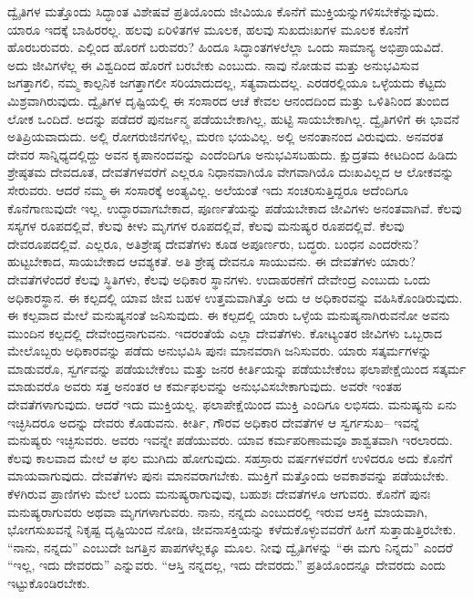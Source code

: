 ದ್ವೈತಿಗಳ ಮತ್ತೊಂದು ಸಿದ್ಧಾಂತ ವಿಶೇಷವೆ ಪ್ರತಿಯೊಂದು ಜೀವಿಯೂ ಕೊನೆಗೆ ಮುಕ್ತಿಯನ್ನುಗಳಿಸಬೇಕೆನ್ನುವುದು. ಯಾರೂ ಇದಕ್ಕೆ ಬಾಹಿರರಲ್ಲ. ಹಲವು ಏರಿಳಿತಗಳ ಮೂಲಕ, ಹಲವು ಸುಖದುಃಖಗಳ ಮೂಲಕ ಕೊನೆಗೆ ಹೊರಬರುವರು. ಎಲ್ಲಿಂದ ಹೊರಗೆ ಬರುವರು? ಹಿಂದೂ ಸಿದ್ಧಾಂತಗಳಲೆಲ್ಲಾ ಒಂದು ಸಾಮಾನ್ಯ ಅಭಿಪ್ರಾಯವಿದೆ. ಅದು ಜೀವಿಗಳೆಲ್ಲ ಈ ವಿಶ್ವದಿಂದ ಹೊರಗೆ ಬರಬೇಕು ಎಂಬುದು. ನಾವು ನೋಡುವ ಮತ್ತು ಅನುಭವಿಸುವ ಜಗತ್ತಾಗಲಿ, ನಮ್ಮ ಕಾಲ್ಪನಿಕ ಜಗತ್ತಾಗಲೀ ಸರಿಯಾದುದಲ್ಲ, ಸತ್ಯವಾದುದಲ್ಲ. ಎರಡರಲ್ಲಿಯೂ ಒಳ್ಳೆಯದು ಕೆಟ್ಟದು ಮಿಶ್ರವಾಗಿರುವುದು. ದ್ವೈತಿಗಳ ದೃಷ್ಟಿಯಲ್ಲಿ ಈ ಸಂಸಾರದ ಆಚೆ ಕೇವಲ ಆನಂದದಿಂದ ಮತ್ತು ಒಳಿತಿನಿಂದ ತುಂಬಿದ ಲೋಕ ಒಂದಿದೆ. ಅದನ್ನು ಪಡೆದರೆ ಪುನರ್ಜನ್ಮ ಪಡೆಯಬೇಕಾಗಿಲ್ಲ, ಹುಟ್ಟಿ ಸಾಯಬೇಕಾಗಿಲ್ಲ. ದ್ವೈತಿಗಳಿಗೆ ಈ ಭಾವನೆ ಅತಿಪ್ರಿಯವಾದುದು. ಅಲ್ಲಿ ರೋಗರುಜಿನಗಳಿಲ್ಲ, ಮರಣ ಭಯವಿಲ್ಲ. ಅಲ್ಲಿ ಅನಂತಾನಂದ ವಿರುವುದು. ಅನವರತ ದೇವರ ಸಾನ್ನಿಧ್ಯದಲ್ಲಿದ್ದು ಅವನ ಕೃಪಾನಂದವನ್ನು ಎಂದೆಂದಿಗೂ ಅನುಭವಿಸಬಹುದು. ಕ್ಷುದ್ರತಮ ಕೀಟದಿಂದ ಹಿಡಿದು ಶ್ರೇಷ್ಠತಮ ದೇವದೂತ, ದೇವತೆಗಳವರೆಗೆ ಎಲ್ಲರೂ ನಿಧಾನವಾಗಿಯೊ ವೇಗವಾಗಿಯೊ ದುಃಖವಿಲ್ಲದ ಆ ಲೋಕವನ್ನು ಸೇರುವರು. ಆದರೆ ನಮ್ಮ ಈ ಸಂಸಾರಕ್ಕೆ ಅಂತ್ಯವಿಲ್ಲ. ಅಲೆಯಂತೆ ಇದು ಸಂಚರಿಸುತ್ತಿದ್ದರೂ ಅದೆಂದಿಗೂ ಕೊನೆಗಾಣುವುದೇ ಇಲ್ಲ. ಉದ್ಧಾರವಾಗಬೇಕಾದ, ಪೂರ್ಣತೆಯನ್ನು ಪಡೆಯಬೇಕಾದ ಜೀವಿಗಳು ಅನಂತವಾಗಿವೆ. ಕೆಲವು ಸಸ್ಯಗಳ ರೂಪದಲ್ಲಿವೆ, ಕೆಲವು ಕೀಳು ಮೃಗಗಳ ರೂಪದಲ್ಲಿವೆ, ಕೆಲವು ಮನುಷ್ಯರ ರೂಪದಲ್ಲಿವೆ. ಕೆಲವು ದೇವರೂಪದಲ್ಲಿವೆ. ಎಲ್ಲರೂ, ಅತಿಶ್ರೇಷ್ಠ ದೇವತೆಗಳು ಕೂಡ ಅಪೂರ್ಣರು, ಬದ್ಧರು. ಬಂಧನ ಎಂದರೇನು? ಹುಟ್ಟಬೇಕಾದ, ಸಾಯಬೇಕಾದ ಆವಶ್ಯಕತೆ. ಅತಿ ಶ್ರೇಷ್ಠ ದೇವನೂ ಸಾಯುವನು. ಈ ದೇವತೆಗಳು ಯಾರು? ದೇವತೆಗಳೆಂದರೆ ಕೆಲವು ಸ್ಥಿತಿಗಳು, ಕೆಲವು ಅಧಿಕಾರ ಸ್ಥಾನಗಳು. ಉದಾಹರಣೆಗೆ ದೇವೇಂದ್ರ ಎಂಬುದು ಒಂದು ಅಧಿಕಾರಸ್ಥಾನ. ಈ ಕಲ್ಪದಲ್ಲಿ ಯಾವ ಜೀವ ಬಹಳ ಉತ್ತಮವಾಗಿತ್ತೊ ಅದು ಆ ಅಧಿಕಾರವನ್ನು ವಹಿಸಿಕೊಂಡಿರುವುದು. ಈ ಕಲ್ಪವಾದ ಮೇಲೆ ಮನುಷ್ಯನಂತೆ ಜನಿಸುವುದು. ಈ ಕಲ್ಪದಲ್ಲಿ ಯಾರು ಒಳ್ಳೆಯ ಮನುಷ್ಯನಾಗಿರುವನೋ ಅವನು ಮುಂದಿನ ಕಲ್ಪದಲ್ಲಿ ದೇವೇಂದ್ರನಾಗುವನು. ಇದರಂತೆಯೆ ಎಲ್ಲಾ ದೇವತೆಗಳು. ಕೋಟ್ಯಂತರ ಜೀವಿಗಳು ಒಬ್ಬರಾದ ಮೇಲೊಬ್ಬರು ಅಧಿಕಾರವನ್ನು ಪಡೆದು ಅನುಭವಿಸಿ ಪುನಃ ಮಾನವರಾಗಿ ಜನಿಸುವರು. ಯಾರು ಸತ್ಕರ್ಮಗಳನ್ನು ಮಾಡುವರೊ, ಸ್ವರ್ಗವನ್ನು ಪಡೆಯಬೇಕೆಂಬ ಮತ್ತು ಜನರ ಕೀರ್ತಿಯನ್ನು ಪಡೆಯಬೇಕೆಂಬ ಫಲಾಪೇಕ್ಷೆಯಿಂದ ಸತ್ಕರ್ಮ ಮಾಡುವರೊ ಅವರು ಸತ್ತ ಅನಂತರ ಆ ಕರ್ಮಫಲವನ್ನು ಅನುಭವಿಸಬೇಕಾಗುವುದು. ಅವರೇ ಇಂತಹ ದೇವತೆಗಳಾಗುವುದು. ಆದರೆ ಇದು ಮುಕ್ತಿಯಲ್ಲ. ಫಲಾಪೇಕ್ಷೆಯಿಂದ ಮುಕ್ತಿ ಎಂದಿಗೂ ಲಭಿಸದು. ಮನುಷ್ಯನು ಏನು ಇಚ್ಛಿಸಿದರೂ ಅದನ್ನು ದೇವರು ಕೊಡುವನು. ಕೀರ್ತಿ, ಗೌರವ ಅಧಿಕಾರ ದೇವತೆಗಳ ಆ ಸ್ವರ್ಗಸುಖ– ಇವನ್ನೆ ಮನುಷ್ಯರು ಇಚ್ಛಿಸುವರು. ಅವರು ಇವನ್ನೇ ಪಡೆಯುವರು. ಯಾವ ಕರ್ಮಪರಿಣಾಮವೂ ಶಾಶ್ವತವಾಗಿ ಇರಲಾರದು. ಕೆಲವು ಕಾಲವಾದ ಮೇಲೆ ಆ ಫಲ ಮುಗಿದು ಹೋಗುವುದು. ಸಹಸ್ರಾರು ವರ್ಷಗಳವರೆಗೆ ಉಳಿದರೂ ಅದು ಕೊನೆಗೆ ಮಾಯವಾಗುವುದು. ದೇವತೆಗಳು ಪುನಃ ಮಾನವರಾಗಬೇಕು. ಮುಕ್ತಿಗೆ ಮತ್ತೊಂದು ಅವಕಾಶವನ್ನು ಪಡೆಯಬೇಕು. ಕೆಳಗಿರುವ ಪ್ರಾಣಿಗಳು ಮೇಲೆ ಬಂದು ಮನುಷ್ಯರಾಗುವುವು, ಬಹುಶಃ ದೇವತೆಗಳೂ ಆಗುವರು. ಕೊನೆಗೆ ಪುನಃ ಮನುಷ್ಯರಾಗುವರು ಅಥವಾ ಮೃಗಗಳಾಗುವರು. ನಾನು, ನನ್ನದು ಎಂಬುದರಲ್ಲಿ ಇರುವ ಆಸಕ್ತಿ ಮಾಯವಾಗಿ, ಭೋಗಸುಖವನ್ನೆ ನಿಕೃಷ್ಟ ದೃಷ್ಟಿಯಿಂದ ನೋಡಿ, ಜೀವನಾಸಕ್ತಿಯನ್ನು ಕಳೆದುಕೊಳ್ಳುವವರೆಗೆ ಹೀಗೆ ಸುತ್ತಾಡುತ್ತಿರಬೇಕು. “ನಾನು, ನನ್ನದು” ಎಂಬುದೇ ಜಗತ್ತಿನ ಪಾಪಗಳೆಲ್ಲಕ್ಕೂ ಮೂಲ. ನೀವು ದ್ವೈತಿಗಳನ್ನು “ಈ ಮಗು ನಿನ್ನದು” ಎಂದರೆ “ಇಲ್ಲ, ಇದು ದೇವರದು” ಎನ್ನುವರು. “ಆಸ್ತಿ ನನ್ನದಲ್ಲ, ಇದು ದೇವರದು.” ಪ್ರತಿಯೊಂದನ್ನೂ ದೇವರದು ಎಂದು ಇಟ್ಟುಕೊಂಡಿರಬೇಕು.

